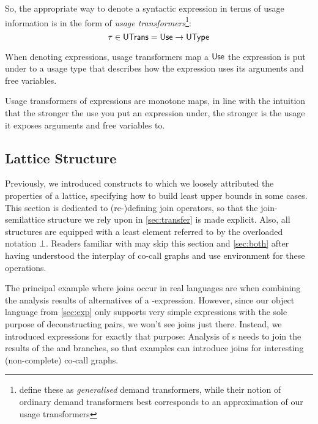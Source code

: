 So, the appropriate way to denote a syntactic expression in terms of usage information is in the form of \emph{usage transformers}\footnote{\textcite{card} define these as \emph{generalised} demand transformers, while their notion of ordinary demand transformers best corresponds to an approximation of our usage transformers}:
\[
\tau \in \text{\textsf{UTrans}} = \text{\textsf{Use}} \to \text{\textsf{UType}}
\]

When denoting expressions, usage transformers map a $\text{\textsf{Use}}$ the expression is put under to a usage type that describes how the expression uses its arguments and free variables.

Usage transformers of expressions are monotone maps, in line with the intuition that the stronger the use you put an expression under, the stronger is the usage it exposes arguments and free variables to.

\subsection{Lattice Structure}\label{sec:lattice}

Previously, we introduced constructs to which we loosely attributed the properties of a lattice, specifying how to build least upper bounds in some cases. 
This section is dedicated to (re-)defining join operators, so that the join-semilattice structure we rely upon in \cref{sec:transfer} is made explicit.
Also, all structures are equipped with a least element referred to by the overloaded notation $\bot$.
Readers familiar with \textcite{card} may skip this section and \cref{sec:both} after having understood the interplay of co-call graphs and use environment for these operations.

The principal example where joins occur in real languages are when combining the analysis results of alternatives of a -expression. 
However, since our object language from \cref{sec:exp} only supports very simple  expressions with the sole purpose of deconstructing pairs, we won't see joins just there. 
Instead, we introduced  expressions for exactly that purpose: 
Analysis of s needs to join the results of the  and  branches, so that examples can introduce joins for interesting (\eg non-complete) co-call graphs.

